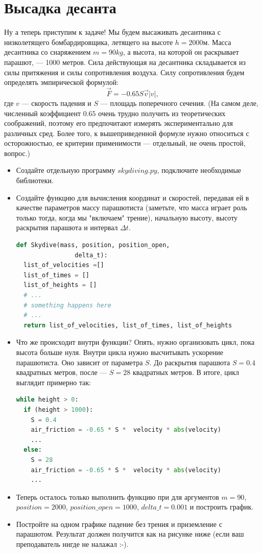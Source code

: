 \documentclass[a4paper,12pt]{article}
\begin{document}
\section{Высадка десанта}
Ну а теперь приступим к задаче! Мы будем высаживать десантника с низколетящего бомбардировщика, летящего на высоте $h = 2000 $м. Масса десантника со снаряжением $m = 90 kg$, а высота, на которой он раскрывает парашют, --- 1000 метров. Сила действующая на десантника складывается из силы притяжения и силы сопротивления воздуха. Силу сопротивления будем определять эмпирической формулой: $$\vec{F} = -0.65 S \vec{v} |v|,$$ где $v$ --- скорость падения и $S$ --- площадь поперечного сечения. (На самом деле, численный коэффициент $0.65$ очень трудно получить из теоретических соображений, поэтому его предпочитают измерять экспериментально для различных сред. Более того, к вышеприведенной формуле нужно относиться с осторожностью, ее критерии применимости --- отдельный, не очень простой, вопрос.)
\begin{itemize}
\item Создайте отдельную программу $skydiving.py$, подключите необходимые библиотеки.
\item Создайте функцию для вычисления координат и скоростей, передавая ей в качестве параметров массу парашютиста (заметьте, что масса играет роль только тогда, когда мы "включаем" трение), начальную высоту, высоту раскрытия парашюта и интервал $\Delta t$.
\begin{lstlisting}[language=python]
def Skydive(mass, position, position_open,
                delta_t):
  list_of_velocities =[]
  list_of_times = []
  list_of_heights = []
  # ...  
  # something happens here
  # ...
  return list_of_velocities, list_of_times, list_of_heights
\end{lstlisting}
\item Что же происходит внутри функции? Опять, нужно организовать цикл, пока высота больше нуля. Внутри цикла нужно высчитывать ускорение парашютиста. Оно зависит от параметра $S$. До раскрытия парашюта $S = 0.4$ квадратных метров, после --- $S = 28$ квадратных метров. В итоге, цикл выглядит примерно так:
\begin{lstlisting}[language=python]
while height > 0:
  if (height > 1000):
    S = 0.4
    air_friction = -0.65 * S *  velocity * abs(velocity)
    ...
  else:
    S = 28
    air_friction = -0.65 * S *  velocity * abs(velocity)
    ...  
\end{lstlisting}
\item Теперь осталось только выполнить функцию при для аргументов $m = 90$, $position = 2000$, $position\_open = 1000$, $delta\_t = 0.001$ и построить график. 
\item Постройте на одном графике падение без трения и приземление с парашютом. Результат должен получится как на рисунке ниже (если ваш преподаватель нигде не налажал :-).
\end{itemize}
\end{document}
